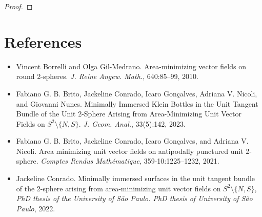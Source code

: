 \documentclass[reqno,11pt]{amsart}
\begin{document}
{\begin{proof}
\end{proof}



\section*{References}

\begin{itemize}
    \item[\textbf{[1]}] Vincent Borrelli and Olga Gil-Medrano. Area-minimizing vector fields on round 2-spheres. \textit{J. Reine Angew. Math.}, 640:85–99, 2010.

    \item[\textbf{[2]}] Fabiano G. B. Brito, Jackeline Conrado, Icaro Gonçalves, Adriana V. Nicoli, and Giovanni Nunes. Minimally Immersed Klein Bottles in the Unit Tangent Bundle of the Unit 2-Sphere Arising from Area-Minimizing Unit Vector Fields on \( S^2 \setminus \{N,S\} \). \textit{J. Geom. Anal.}, 33(5):142, 2023.

    \item[\textbf{[3]}] Fabiano G. B. Brito, Jackeline Conrado, Icaro Gonçalves, and Adriana V. Nicoli. Area minimizing unit vector fields on antipodally punctured unit 2-sphere. \textit{Comptes Rendus Mathématique}, 359-10:1225–1232, 2021.

    \item[\textbf{[4]}] Jackeline Conrado. Minimally immersed surfaces in the unit tangent bundle of the 2-sphere arising from area-minimizing unit vector fields on \( S^2 \setminus \{N,S\} \), \textit{PhD thesis of the University of São Paulo. PhD thesis of University of São Paulo}, 2022.


\end{itemize}}
\end{document}
